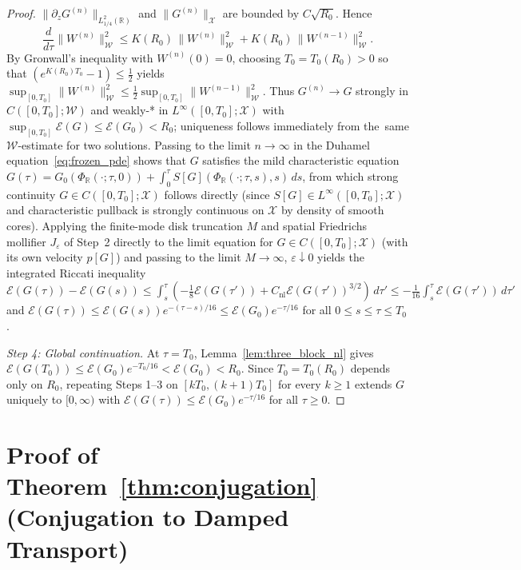 \documentclass[11pt,a4paper]{article}
\begin{document}
\begin{proof}
$\|\partial_z G^{(n)}\|_{L^2_{1/4}(\mathbb{R})}$ and $\|G^{(n)}\|_{\mathcal{X}}$ are bounded by $C\sqrt{R_0}$.
Hence
\[
\frac{d}{d\tau}\|W^{(n)}\|_{\mathcal{W}}^2 \le K(R_0)\,\|W^{(n)}\|_{\mathcal{W}}^2 + K(R_0)\,\|W^{(n-1)}\|_{\mathcal{W}}^2.
\]
By Gronwall's inequality with $W^{(n)}(0)=0$, choosing $T_0 = T_0(R_0) > 0$ so that $(e^{K(R_0)T_0}-1)\le\frac{1}{2}$ yields
$\sup_{[0,T_0]}\|W^{(n)}\|_{\mathcal{W}}^2 \le \frac{1}{2}\sup_{[0,T_0]}\|W^{(n-1)}\|_{\mathcal{W}}^2$.
Thus $G^{(n)}\to G$ strongly in $C([0,T_0];\mathcal{W})$ and weakly-* in $L^\infty([0,T_0];\mathcal{X})$ with
$\sup_{[0,T_0]}\mathcal{E}(G)\le\mathcal{E}(G_0)<R_0$; uniqueness follows immediately from the\allowbreak\ same $\mathcal{W}$-estimate
for two solutions. Passing to the limit $n\to\infty$ in the Duhamel equation~\eqref{eq:frozen_pde} shows that $G$ satisfies the
mild characteristic equation $G(\tau)=G_0(\Phi_{\mathbb{R}}(\cdot;\tau,0))+\int_0^\tau S[G](\Phi_{\mathbb{R}}(\cdot;\tau,s),s)\,ds$,
from which strong continuity $G\in C([0,T_0];\mathcal{X})$ follows directly (since $S[G]\in L^\infty([0,T_0];\mathcal{X})$ and
characteristic pullback is strongly continuous on $\mathcal{X}$ by density of smooth cores). Applying the finite-mode disk truncation $M$ and spatial Friedrichs mollifier $J_\varepsilon$ of Step~2 directly to the limit equation for $G\in C([0,T_0];\mathcal{X})$ (with its own velocity $p[G]$) and passing to the limit $M\to\infty$, $\varepsilon\downarrow 0$ yields the integrated Riccati inequality $\mathcal{E}(G(\tau))-\mathcal{E}(G(s))\le\int_s^\tau(-\frac18\mathcal{E}(G(\tau'))+C_{\mathrm{nl}}\mathcal{E}(G(\tau'))^{3/2})\,d\tau'\le -\frac{1}{16}\int_s^\tau\mathcal{E}(G(\tau'))\,d\tau'$ and $\mathcal{E}(G(\tau))\le\mathcal{E}(G(s))e^{-(\tau-s)/16}\le\mathcal{E}(G_0)e^{-\tau/16}$ for all $0\le s\le\tau\le T_0$.

\emph{Step 4: Global continuation.}
At $\tau=T_0$, Lemma~\ref{lem:three_block_nl} gives $\mathcal{E}(G(T_0))\le\mathcal{E}(G_0)e^{-T_0/16}<\mathcal{E}(G_0)<R_0$.
Since $T_0=T_0(R_0)$ depends only on $R_0$, repeating Steps 1--3 on $[k T_0, (k+1)T_0]$ for every $k\ge 1$ extends $G$ uniquely
to $[0,\infty)$ with $\mathcal{E}(G(\tau))\le\mathcal{E}(G_0)e^{-\tau/16}$ for all $\tau\ge 0$.
\end{proof}

\section{Proof of Theorem~\ref{thm:conjugation} (Conjugation to Damped Transport)}
\label{app:conj}
\end{document}

